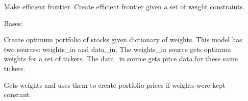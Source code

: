 \documentclass[letterpaper,10pt,english]{sphinxmanual}
\begin{document}
\begin{fulllineitems}

\begin{fulllineitems}
\label{\detokenize{dalio.model:dalio.model.financial.MakeEfficientFrontier.run}}
Make efficient frontier.
Create efficient frontier given a set of weight constraints.

\end{fulllineitems}


\begin{fulllineitems}
\label{\detokenize{dalio.model:dalio.model.financial.MakeEfficientFrontier.weight_bounds}}
\end{fulllineitems}


\end{fulllineitems}


\begin{fulllineitems}
\label{\detokenize{dalio.model:dalio.model.financial.OptimumPortfolio}}
Bases: {\hyperref[\detokenize{dalio.model:dalio.model.model.Model}]{}}

Create optimum portfolio of stocks given dictionary of weights.
This model has two sources: weights\_in and data\_in. The weights\_in source
gets optimum weights for a set of tickers. The data\_in source gets price
data for these same tickers.

\begin{fulllineitems}
\label{\detokenize{dalio.model:dalio.model.financial.OptimumPortfolio.run}}
Gets weights and uses them to create portfolio prices if weights
were kept constant.

\end{fulllineitems}


\end{fulllineitems}
\end{document}
